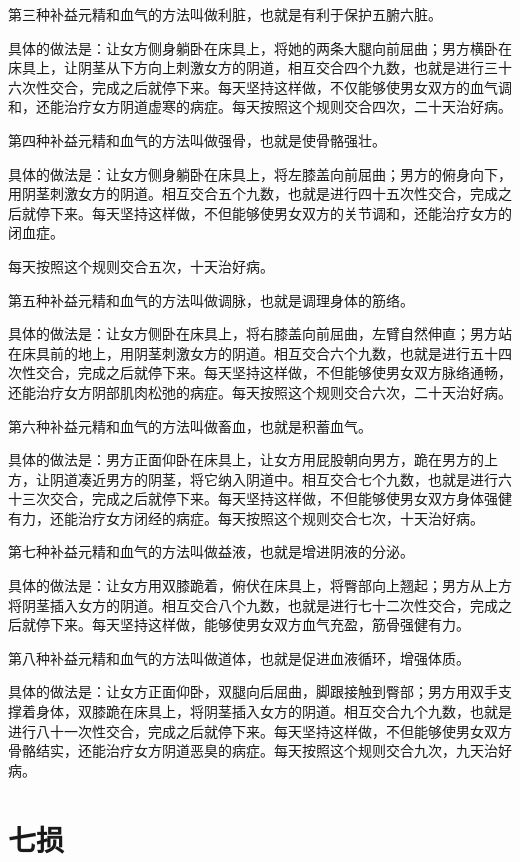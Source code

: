 \documentclass[a4paper,12pt,UTF8,twoside]{ctexbook}
\begin{document}
第三种补益元精和血气的方法叫做利脏，也就是有利于保护五腑六脏。

具体的做法是：让女方侧身躺卧在床具上，将她的两条大腿向前屈曲；男方横卧在床具上，让阴茎从下方向上刺激女方的阴道，相互交合四个九数，也就是进行三十六次性交合，完成之后就停下来。每天坚持这样做，不仅能够使男女双方的血气调和，还能治疗女方阴道虚寒的病症。每天按照这个规则交合四次，二十天治好病。

第四种补益元精和血气的方法叫做强骨，也就是使骨骼强壮。

具体的做法是：让女方侧身躺卧在床具上，将左膝盖向前屈曲；男方的俯身向下，用阴茎刺激女方的阴道。相互交合五个九数，也就是进行四十五次性交合，完成之后就停下来。每天坚持这样做，不但能够使男女双方的关节调和，还能治疗女方的闭血症。

每天按照这个规则交合五次，十天治好病。

第五种补益元精和血气的方法叫做调脉，也就是调理身体的筋络。

具体的做法是：让女方侧卧在床具上，将右膝盖向前屈曲，左臂自然伸直；男方站在床具前的地上，用阴茎刺激女方的阴道。相互交合六个九数，也就是进行五十四次性交合，完成之后就停下来。每天坚持这样做，不但能够使男女双方脉络通畅，还能治疗女方阴部肌肉松弛的病症。每天按照这个规则交合六次，二十天治好病。

第六种补益元精和血气的方法叫做畜血，也就是积蓄血气。

具体的做法是：男方正面仰卧在床具上，让女方用屁股朝向男方，跪在男方的上方，让阴道凑近男方的阴茎，将它纳入阴道中。相互交合七个九数，也就是进行六十三次交合，完成之后就停下来。每天坚持这样做，不但能够使男女双方身体强健有力，还能治疗女方闭经的病症。每天按照这个规则交合七次，十天治好病。

第七种补益元精和血气的方法叫做益液，也就是增进阴液的分泌。

具体的做法是：让女方用双膝跪着，俯伏在床具上，将臀部向上翘起；男方从上方将阴茎插入女方的阴道。相互交合八个九数，也就是进行七十二次性交合，完成之后就停下来。每天坚持这样做，能够使男女双方血气充盈，筋骨强健有力。

第八种补益元精和血气的方法叫做道体，也就是促进血液循环，增强体质。

具体的做法是：让女方正面仰卧，双腿向后屈曲，脚跟接触到臀部；男方用双手支撑着身体，双膝跪在床具上，将阴茎插入女方的阴道。相互交合九个九数，也就是进行八十一次性交合，完成之后就停下来。每天坚持这样做，不但能够使男女双方骨骼结实，还能治疗女方阴道恶臭的病症。每天按照这个规则交合九次，九天治好病。

\chapter{七损}
\end{document}
